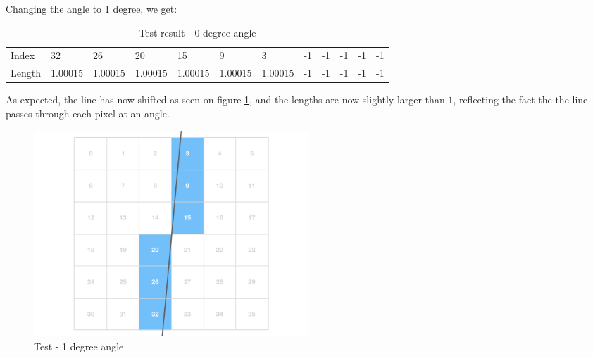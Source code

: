 Changing the angle to 1 degree, we get:
\begin{table}[H]
    \centering
    \caption{Test result - 0 degree angle}
    \begin{tabular}{llllllllllll}
    Index  & 32 & 26 & 20 & 15 & 9 & 3 & -1 & -1 & -1 & -1 & -1 \\
    Length & 1.00015  & 1.00015  & 1.00015  & 1.00015  & 1.00015 & 1.00015 & -1 & -1 & -1 & -1 & -1
    \end{tabular}
\end{table}
As expected, the line has now shifted as seen on figure \ref{test1}, and the lengths are now slightly larger than $1$, reflecting the fact the the line passes through each pixel at an angle. 
\begin{figure}[H]
    \centering
    \caption{Test - 1 degree angle}
    \label{test1}
    \includegraphics[width=0.5\textwidth]{figures/test_1.png}
\end{figure}

